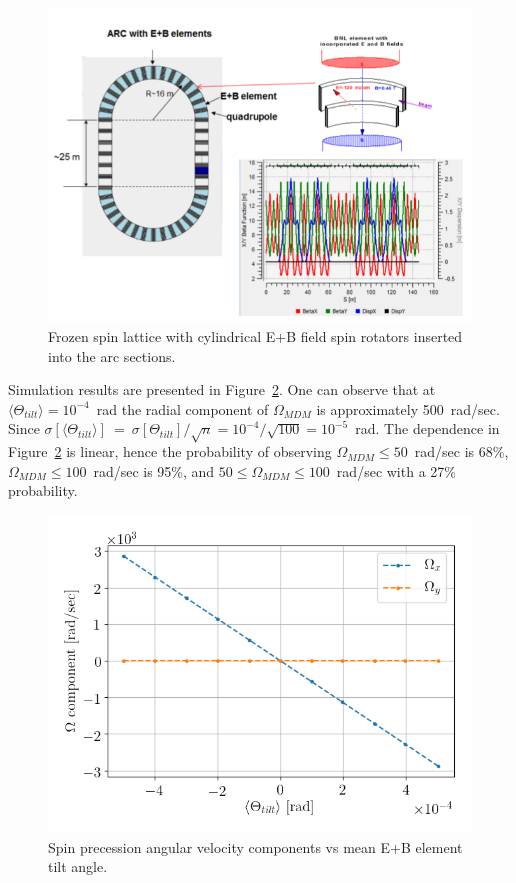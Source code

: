 \documentclass[12pt]{article}
\newcommand{\avg}[1]{\langle{#1}\rangle}
\newcommand{\W}{\Omega}
\begin{document}
\begin{figure}[h]\centering
	\includegraphics[width=\linewidth]{Figures/BNL}
	\caption{Frozen spin lattice with cylindrical E+B field spin rotators inserted into the arc sections.\label{fig:Lattice}}
\end{figure}

Simulation results are presented in Figure~\ref{fig:MDM_vs_tilt}. One can observe that at $\avg{\Theta_{tilt}}=10^{-4}$~rad the radial component of $\W_{MDM}$ is approximately 500~rad/sec. 
Since $\sigma[\avg{\Theta_{tilt}}]~=~\sigma[\Theta_{tilt}]/\sqrt{n} = 10^{-4}/\sqrt{100} = 10^{-5}$~rad. The dependence in Figure~\ref{fig:MDM_vs_tilt} is linear, hence the probability of observing $\W_{MDM}\le 50$~rad/sec is 68\%, $\W_{MDM}\le 100$~rad/sec is 95\%, and $50\le\W_{MDM}\le100$~rad/sec with a 27\% probability.

\begin{figure}[h]\centering
	\includegraphics[width=\linewidth]{Figures/linearity_test_shifting_gauss_freq}
	\caption{Spin precession angular velocity components vs mean E+B element tilt angle.\label{fig:MDM_vs_tilt}}
\end{figure}
\end{document}
